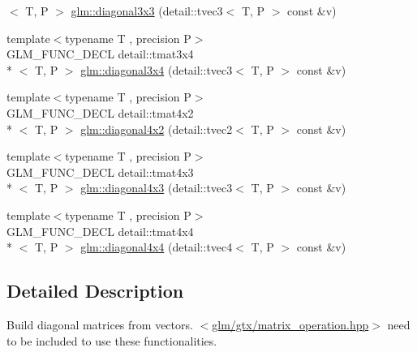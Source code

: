 \begin{DoxyCompactItemize}
$<$ T, P $>$ \hyperlink{group__gtx__matrix__operation_gaa49be0f424ad2f3015c5945c13a5fad0}{glm\-::diagonal3x3} (detail\-::tvec3$<$ T, P $>$ const \&v)
\item 
{\footnotesize template$<$typename T , precision P$>$ }\\G\-L\-M\-\_\-\-F\-U\-N\-C\-\_\-\-D\-E\-C\-L detail\-::tmat3x4\\*
$<$ T, P $>$ \hyperlink{group__gtx__matrix__operation_gab96c533557a191bd972300868f8111ef}{glm\-::diagonal3x4} (detail\-::tvec3$<$ T, P $>$ const \&v)
\item 
{\footnotesize template$<$typename T , precision P$>$ }\\G\-L\-M\-\_\-\-F\-U\-N\-C\-\_\-\-D\-E\-C\-L detail\-::tmat4x2\\*
$<$ T, P $>$ \hyperlink{group__gtx__matrix__operation_ga1ec0fc953d871fc9894bcfcc81dbaf68}{glm\-::diagonal4x2} (detail\-::tvec2$<$ T, P $>$ const \&v)
\item 
{\footnotesize template$<$typename T , precision P$>$ }\\G\-L\-M\-\_\-\-F\-U\-N\-C\-\_\-\-D\-E\-C\-L detail\-::tmat4x3\\*
$<$ T, P $>$ \hyperlink{group__gtx__matrix__operation_gaff804ead2f02ac48c8daf0d44a81d224}{glm\-::diagonal4x3} (detail\-::tvec3$<$ T, P $>$ const \&v)
\item 
{\footnotesize template$<$typename T , precision P$>$ }\\G\-L\-M\-\_\-\-F\-U\-N\-C\-\_\-\-D\-E\-C\-L detail\-::tmat4x4\\*
$<$ T, P $>$ \hyperlink{group__gtx__matrix__operation_ga0c286e9aa92074f12663617cfedfa72c}{glm\-::diagonal4x4} (detail\-::tvec4$<$ T, P $>$ const \&v)
\end{DoxyCompactItemize}


\subsection{Detailed Description}
Build diagonal matrices from vectors. $<$\hyperlink{matrix__operation_8hpp}{glm/gtx/matrix\-\_\-operation.\-hpp}$>$ need to be included to use these functionalities. 

